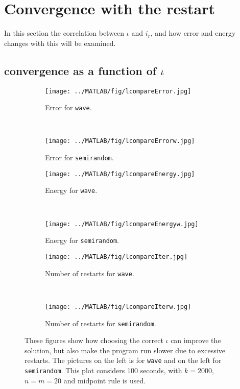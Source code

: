 \section{Convergence with the restart}%
In this section the correlation between $\iota$ and $i_r$, and how error and energy changes with this will be examined.
\subsection{convergence as a function of $\iota$}%
\begin{figure}[H]
        \centering
        \begin{subfigure}[b]{0.45\textwidth}
                \texttt{[image: ../MATLAB/fig/lcompareError.jpg]}
                \caption{ Error for \texttt{wave}. }
                \label{fig:lcompareError}
        \end{subfigure}
		~
		\begin{subfigure}[b]{0.45\textwidth}
                \texttt{[image: ../MATLAB/fig/lcompareErrorw.jpg]}
                \caption{ Error for \texttt{semirandom}. }
                \label{fig:lcompareErrorw}
        \end{subfigure}
        
                \begin{subfigure}[b]{0.45\textwidth}
                \texttt{[image: ../MATLAB/fig/lcompareEnergy.jpg]}
                \caption{ Energy for \texttt{wave}. }
                \label{fig:lcompareEnergy}
        \end{subfigure}
		~
		\begin{subfigure}[b]{0.45\textwidth}
                \texttt{[image: ../MATLAB/fig/lcompareEnergyw.jpg]}
                \caption{ Energy for \texttt{semirandom}. }
                \label{fig:lcompareEnergyw}
        \end{subfigure}
        
                \begin{subfigure}[b]{0.45\textwidth}
                \texttt{[image: ../MATLAB/fig/lcompareIter.jpg]}
                \caption{ Number of restarts for \texttt{wave}. }
                \label{fig:lcompareIter}
        \end{subfigure}
		~
		\begin{subfigure}[b]{0.45\textwidth}
                \texttt{[image: ../MATLAB/fig/lcompareIterw.jpg]}
                \caption{ Number of restarts for \texttt{semirandom}. }
                \label{fig:lcompareIterw}
        \end{subfigure}
        \caption{ These figures show how choosing the correct $\iota$ can improve the solution, but also make the program run slower due to excessive restarts. The pictures on the left is for \texttt{wave} and on the left for \texttt{semirandom}. This plot considers 100 seconds, with $k = 2000$, $n = m = 20$ and midpoint rule is used.  }
        \label{fig:lcompare}
\end{figure}
